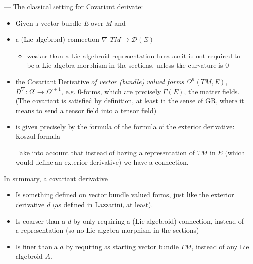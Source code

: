 {\begin{itemize}
    \end{itemize}


---
The classical setting for Covariant derivate: 

    \begin{itemize}
    
    \item Given a vector bundle $E$ over $M$ and
    
    \item a (Lie algebroid) connection $\nabla: TM \to \mathcal D(E)$ 
        
        \begin{itemize}
        
        \item weaker than a Lie algebroid representation because it is not required to be a Lie algebra morphism in the sections, unless the curvature is $0$
        
        \end{itemize}
    
    \item the Covariant Derivative \emph{of vector (bundle) valued forms} $\Omega^n(TM, E)$, $D^\nabla: \Omega^\cdot \to \Omega^{\cdot+1}$, e.g. $0$-forms, which are precisely $\Gamma(E)$, the matter fields. (The covariant is satisfied by definition, at least in the sense of GR, where it means to send a tensor field into a tensor field)
    
    \item is given precisely by the formula of the formula of the exterior derivative: Koszul formula
    
    Take into account that instead of having a representation of $TM$ in $E$ (which would define an exterior derivative) we have a connection.
    \end{itemize}
    
In summary, a covariant derivative 
    \begin{itemize}
    
    \item Is something defined on vector bundle valued forms, just like the exterior derivative $d$ (as defined in Lazzarini, at least).
    
    \item Is coarser than a $d$ by only requiring a (Lie algebroid) connection, instead of a representation (so no Lie algebra morphism in the sections)
    
    \item Is finer than a $d$ by requiring as starting vector bundle $TM$, instead of any Lie algebroid $A$.
    

\end{itemize}}
